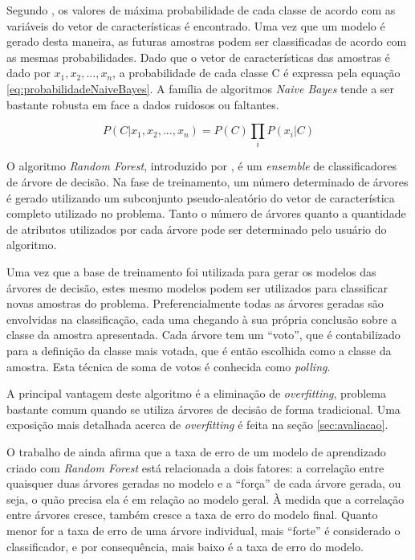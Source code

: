 Segundo , os valores de máxima probabilidade de cada classe de acordo com as variáveis do vetor de características é encontrado. Uma vez que um modelo é gerado desta maneira, as futuras amostras podem ser classificadas de acordo com as mesmas probabilidades. Dado que o vetor de características das amostras é dado por $x_1, x_2,...,x_n$, a probabilidade de cada classe C é expressa pela equação \ref{eq:probabilidadeNaiveBayes}. A família de algoritmos \textit{Naive Bayes} tende a ser bastante robusta em face a dados ruidosos ou faltantes.

\begin{equation}
	\displaystyle P(C|x_1,x_2,...,x_n) = P(C) \prod_{i}{P(x_i|C)}
\label{eq:probabilidadeNaiveBayes}
\end{equation}


O algoritmo \textit{Random Forest}, introduzido por  , é um \textit{ensemble} de classificadores de árvore de decisão. Na fase de treinamento, um número determinado de árvores é gerado utilizando um subconjunto pseudo-aleatório do vetor de característica completo utilizado no problema. Tanto o número de árvores quanto a quantidade de atributos utilizados por cada árvore pode ser determinado pelo usuário do algoritmo.

Uma vez que a base de treinamento foi utilizada para gerar os modelos das árvores de decisão, estes mesmo modelos podem ser utilizados para classificar novas amostras do problema. Preferencialmente todas as árvores geradas são envolvidas na classificação, cada uma chegando à sua própria conclusão sobre a classe da amostra apresentada. Cada árvore tem um ``voto'', que é contabilizado para a definição da classe mais votada, que é então escolhida como a classe da amostra. Esta técnica de soma de votos é conhecida como \textit{polling}.

A principal vantagem deste algoritmo é a eliminação de \textit{overfitting}, problema bastante comum quando se utiliza árvores de decisão de forma tradicional. Uma exposição mais detalhada acerca de \textit{overfitting} é feita na seção \ref{sec:avaliacao}.

O trabalho de  ainda afirma que a taxa de erro de um modelo de aprendizado criado com \textit{Random Forest} está relacionada a dois fatores: a correlação entre quaisquer duas árvores geradas no modelo e a ``força'' de cada árvore gerada, ou seja, o quão precisa ela é em relação ao modelo geral. À medida que a correlação entre árvores cresce, também cresce a taxa de erro do modelo final. Quanto menor for a taxa de erro de uma árvore individual, mais ``forte'' é considerado o classificador, e por consequência, mais baixo é a taxa de erro do modelo.

